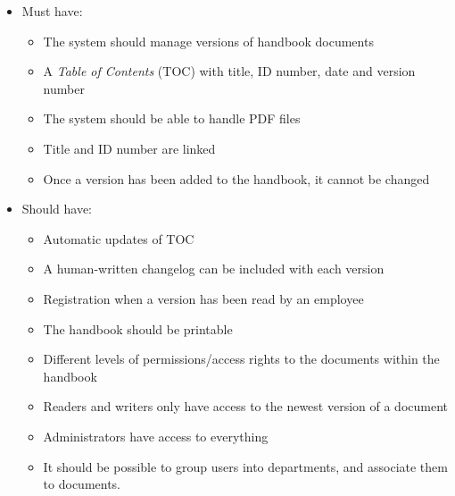 \begin{itemize}
    \item
    Must have:
        \begin{itemize}
            \item
            The system should manage versions of handbook documents
            \item
            A \textit{Table of Contents} (TOC) with title, ID number, date and version number
            \item
            The system should be able to handle PDF files
            \item
            Title and ID number are linked
            \item
            Once a version has been added to the handbook, it cannot be changed
        \end{itemize}
    \item
    Should have:
        \begin{itemize}
			\item
			Automatic updates of TOC
            \item
            A human-written changelog can be included with each version
            \item
            Registration when a version has been read by an employee
            \item
            The handbook should be printable
            \item
            Different levels of permissions/access rights to the documents within the handbook
            \item
            Readers and writers only have access to the newest version of a document
            \item
            Administrators have access to everything
            \item
            It should be possible to group users into departments, and associate them to documents.

\end{itemize}
\end{itemize}
